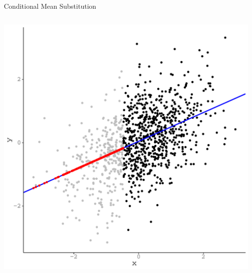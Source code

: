 \documentclass{beamer}\usepackage[]{graphicx}\usepackage[]{color}
\newenvironment{knitrout}{}{} %
\begin{document}
\begin{frame}[fragile]{Conditional Mean Substitution}
\begin{columns}
\begin{column}{0.5\textwidth}
\begin{knitrout}
{\centering \includegraphics[width=0.9\linewidth]{figure/unnamed-chunk-41-1} 

}



\end{knitrout}
  
\end{column}
\end{columns}

\end{frame}

\end{document}

